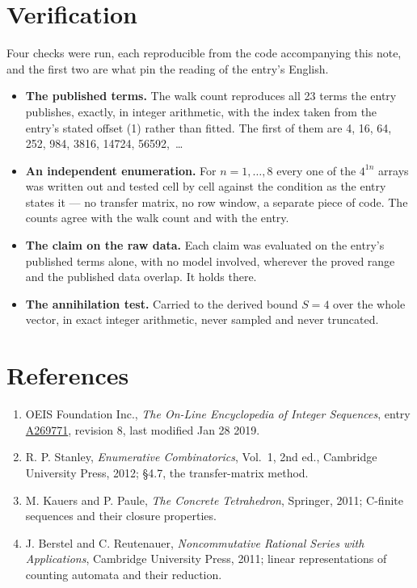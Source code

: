 \documentclass[11pt]{article}
\theoremstyle{definition}
\begin{document}
\section{Verification}

Four checks were run, each reproducible from the code accompanying this note, and the first two are what pin the reading of the entry's English.

\begin{itemize}

\item {\bfseries The published terms.} The walk count reproduces all 23 terms the entry publishes, exactly, in integer arithmetic, with the index taken from the entry's stated offset (1) rather than fitted. The first of them are 4, 16, 64, 252, 984, 3816, 14724, 56592,~\dots

\item {\bfseries An independent enumeration.} For $n = 1,\dots,8$ every one of the $4^{1n}$ arrays was written out and tested cell by cell against the condition as the entry states it --- no transfer matrix, no row window, a separate piece of code. The counts agree with the walk count and with the entry.

\item {\bfseries The claim on the raw data.} Each claim was evaluated on the entry's published terms alone, with no model involved, wherever the proved range and the published data overlap. It holds there.

\item {\bfseries The annihilation test.} Carried to the derived bound $S = 4$ over the whole vector, in exact integer arithmetic, never sampled and never truncated.

\end{itemize}

\section{References}

\begin{enumerate}

\item OEIS Foundation Inc., \emph{The On-Line Encyclopedia of Integer Sequences}, entry \href{https://oeis.org/A269771}{A269771}, revision 8, last modified Jan 28 2019.

\item R. P. Stanley, \emph{Enumerative Combinatorics}, Vol.~1, 2nd ed., Cambridge University Press, 2012; \S4.7, the transfer-matrix method.

\item M. Kauers and P. Paule, \emph{The Concrete Tetrahedron}, Springer, 2011; C-finite sequences and their closure properties.

\item J. Berstel and C. Reutenauer, \emph{Noncommutative Rational Series with Applications}, Cambridge University Press, 2011; linear representations of counting automata and their reduction.

\end{enumerate}
\end{document}
